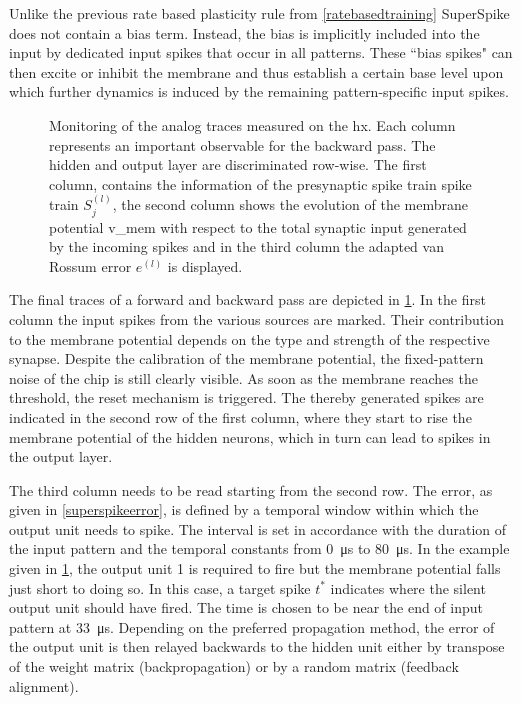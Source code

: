 Unlike the previous rate based plasticity rule from \cref{ratebasedtraining} SuperSpike does not contain a bias term. Instead, the bias is implicitly included into the input by dedicated input spikes that occur in all patterns. These ``bias spikes" can then excite or inhibit the membrane and thus establish a certain base level upon which further dynamics is induced by the remaining pattern-specific input spikes.

\begin{figure}
	\centering
	
	\caption[Monitoring of the analog traces measured on the \gls{hx}.]{Monitoring of the analog traces measured on the \gls{hx}. Each column represents an important observable for the backward pass. The hidden and output layer are discriminated row-wise. The first column, contains the information of the presynaptic spike train spike train $S_j^{(l)}$, the second column shows the evolution of the membrane potential \gls{v_mem} with respect to the total synaptic input generated by the incoming spikes and in the third column the adapted van Rossum error $e^{(l)}$ is displayed.}
	\label{debugplot}
\end{figure}

The final traces of a forward and backward pass are depicted in \cref{debugplot}. In the first column the input spikes from the various sources are marked. Their contribution to the membrane potential depends on the type and strength of the respective synapse. Despite the calibration of the membrane potential, the fixed-pattern noise of the chip is still clearly visible. As soon as the membrane reaches the threshold, the reset mechanism is triggered. The thereby generated spikes are indicated in the second row of the first column, where they start to rise the membrane potential of the hidden neurons, which in turn can lead to spikes in the output layer.

The third column needs to be read starting from the second row. The error, as given in \cref{superspikeerror}, is defined by a temporal window within which the output unit needs to spike.
The interval is set in accordance with the duration of the input pattern and the temporal constants from \SI{0}{\micro \s} to \SI{80}{\micro \s}. In the example given in \cref{debugplot}, the output unit 1 is required to fire but the membrane potential falls just short to doing so. In this case, a target spike $t^*$ indicates where the silent output unit should have fired. The time is chosen to be near the end of input pattern at \SI{33}{\micro \s}. Depending on the preferred propagation method, the error of the output unit is then relayed backwards to the hidden unit either by transpose of the weight matrix (backpropagation) or by a random matrix (feedback alignment).

